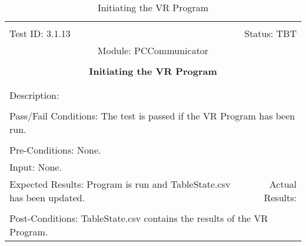 \documentclass[titlepage]{article}
\begin{document}
\begin{center}%
\begin{table}
\begin{tabular}{|l r|}\hline&\\[-2mm]
	Test ID: 3.1.13	&Status: TBT\\[-3mm]
	\multicolumn{2}{|c|}{Module: PCCommunicator}\\&\\
	\multicolumn{2}{|c|}{\textbf{\large{Initiating the VR Program}}}\\&\\\hline&\\[-3mm]
	\multicolumn{2}{|p{\textwidth}|}{Description: }\\[1mm]\hline&\\[-3mm]
	\multicolumn{2}{|p{\textwidth}|}{Pass/Fail Conditions: The test is passed if the VR Program has been run.}\\[1mm]\hline&\\[-3mm]
	\multicolumn{2}{|p{\textwidth}|}{Pre-Conditions: None.}\\[4mm]
	\multicolumn{2}{|p{\textwidth}|}{Input: None.}\\[2mm]\hline
	\multicolumn{1}{|p{0.49\textwidth}}{Expected Results: Program is run and TableState.csv has been updated.}	&\multicolumn{1}{|p{0.45\textwidth}|}{Actual Results: }\\\hline&\\[-3mm]
	\multicolumn{2}{|p{\textwidth}|}{Post-Conditions: TableState.csv contains the results of the VR Program.}\\\hline
\end{tabular}
\caption{Initiating the VR Program}
\end{table}
\end{center}
\end{document}
